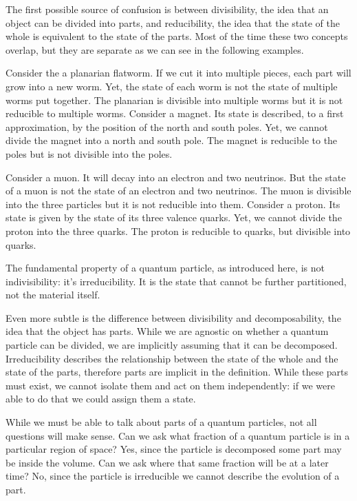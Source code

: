 \documentclass[aps,pra,10pt,twocolumn,floatfix,nofootinbib]{revtex4-1}
\numberwithin{equation}{section}
\theoremstyle{definition}
\begin{document}
The first possible source of confusion is between divisibility, the idea that an object can be divided into parts, and reducibility, the idea that the state of the whole is equivalent to the state of the parts. Most of the time these two concepts overlap, but they are separate as we can see in the following examples.

Consider the a planarian flatworm. If we cut it into multiple pieces, each part will grow into a new worm. Yet, the state of each worm is not the state of multiple worms put together. The planarian is divisible into multiple worms but it is not reducible to multiple worms. Consider a magnet. Its state is described, to a first approximation, by the position of the north and south poles. Yet, we cannot divide the magnet into a north and south pole. The magnet is reducible to the poles but is not divisible into the poles.

Consider a muon. It will decay into an electron and two neutrinos. But the state of a muon is not the state of an electron and two neutrinos. The muon is divisible into the three particles but it is not reducible into them. Consider a proton. Its state is given by the state of its three valence quarks. Yet, we cannot divide the proton into the three quarks. The proton is reducible to quarks, but divisible into quarks.

The fundamental property of a quantum particle, as introduced here, is not indivisibility: it's irreducibility. It is the state that cannot be further partitioned, not the material itself.

Even more subtle is the difference between divisibility and decomposability, the idea that the object has parts. While we are agnostic on whether a quantum particle can be divided, we are implicitly assuming that it can be decomposed. Irreducibility describes the relationship between the state of the whole and the state of the parts, therefore parts are implicit in the definition. While these parts must exist, we cannot isolate them and act on them independently: if we were able to do that we could assign them a state.

While we must be able to talk about parts of a quantum particles, not all questions will make sense. Can we ask what fraction of a quantum particle is in a particular region of space? Yes, since the particle is decomposed some part may be inside the volume. Can we ask where that same fraction will be at a later time? No, since the particle is irreducible we cannot describe the evolution of a part.
\end{document}
